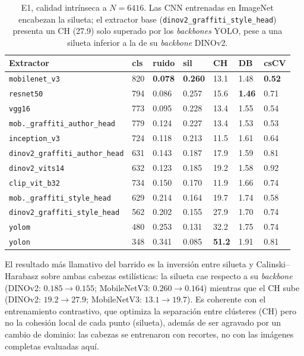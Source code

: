 \begin{table}[h]
\caption[E1, calidad intrínseca a $N=6416$]{E1, calidad intrínseca a $N=6416$. Las CNN entrenadas en ImageNet encabezan la silueta; el extractor base
(\texttt{dinov2\_graffiti\_style\_head}) presenta un CH (27.9) solo superado
por los \textit{backbones} YOLO, pese a una silueta inferior a la de su
\textit{backbone} DINOv2. \glosacalidad}
\label{tab:e1-quality-6416}
\centering
{\footnotesize
\begin{tabular}{|p{4.5cm}|p{0.9cm}|p{0.9cm}|p{0.9cm}|p{0.9cm}|p{0.9cm}|p{0.9cm}|} \hline
  \textbf{Extractor} & \textbf{cls} & \textbf{ruido} & \textbf{sil} & \textbf{CH} & \textbf{DB} & \textbf{csCV} \\ \hline
  \texttt{mobilenet\_v3}                  & 820 & \textbf{0.078} & \textbf{0.260} & 13.1 & 1.48 & \textbf{0.52} \\ \hline
  \texttt{resnet50}                       & 794 & 0.086 & 0.257 & 15.6 & \textbf{1.46} & 0.71 \\ \hline
  \texttt{vgg16}                          & 773 & 0.095 & 0.228 & 13.4 & 1.55 & 0.54 \\ \hline
  \texttt{mob.\_graffiti\_author\_head}   & 779 & 0.124 & 0.227 & 13.4 & 1.53 & 0.53 \\ \hline
  \texttt{inception\_v3}                  & 724 & 0.118 & 0.213 & 11.5 & 1.61 & 0.64 \\ \hline
  \texttt{dinov2\_graffiti\_author\_head} & 631 & 0.143 & 0.187 & 17.9 & 1.59 & 0.81 \\ \hline
  \texttt{dinov2\_vits14}                 & 632 & 0.123 & 0.185 & 19.2 & 1.58 & 0.92 \\ \hline
  \texttt{clip\_vit\_b32}                 & 734 & 0.150 & 0.170 & 11.9 & 1.66 & 0.74 \\ \hline
  \texttt{mob.\_graffiti\_style\_head}    & 629 & 0.214 & 0.164 & 19.7 & 1.74 & 0.58 \\ \hline
  \texttt{dinov2\_graffiti\_style\_head}  & 562 & 0.202 & 0.155 & 27.9 & 1.70 & 0.74 \\ \hline
  \texttt{yolom}                          & 480 & 0.253 & 0.131 & 32.2 & 1.75 & 0.74 \\ \hline
  \texttt{yolon}                          & 348 & 0.341 & 0.085 & \textbf{51.2} & 1.91 & 0.81 \\ \hline
\end{tabular}
}
\end{table}

El resultado más llamativo del barrido es la inversión entre silueta y
Calinski--Harabasz sobre ambas cabezas estilísticas: la silueta cae respecto a
su \textit{backbone} (DINOv2: $0.185\to0.155$; MobileNetV3: $0.260\to0.164$)
mientras que el CH sube (DINOv2: $19.2\to27.9$; MobileNetV3: $13.1\to19.7$). Es
coherente con el entrenamiento contrastivo, que optimiza la separación entre
clústeres (CH) pero no la cohesión local de cada punto (silueta), además de ser
agravado por un cambio de dominio: las cabezas se entrenaron con recortes, no
con las imágenes completas evaluadas aquí.

